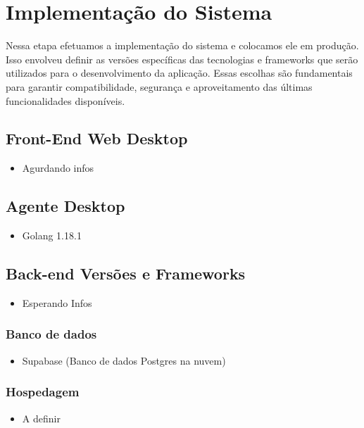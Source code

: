 \chapter{Implementação do Sistema}

Nessa etapa efetuamos a implementação do sistema e colocamos ele em produção. Isso envolveu definir as versões específicas das tecnologias e frameworks que serão utilizados para o desenvolvimento da aplicação. Essas escolhas são fundamentais para garantir compatibilidade, segurança e aproveitamento das últimas funcionalidades disponíveis.

\section{Front-End Web Desktop}
\begin{itemize}
\item Agurdando infos
\end{itemize}

\section{Agente Desktop}

\begin{itemize}
\item Golang 1.18.1
\end{itemize}



\section{Back-end Versões e Frameworks}
\begin{itemize}
\item Esperando Infos
\end{itemize}
\subsection{Banco de dados}
\begin{itemize}
\item Supabase (Banco de dados Postgres na nuvem)
\end{itemize}
\subsection{Hospedagem}
\begin{itemize}
\item A definir
\end{itemize}


